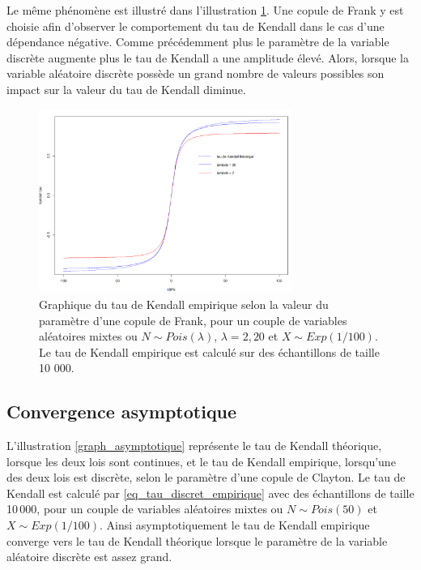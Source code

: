 \documentclass{article}
\begin{document}
 	Le même phénomène est illustré dans l'illustration \ref{graph_frank}. Une copule de Frank y est choisie afin d'observer le comportement du tau de Kendall dans le cas d'une dépendance négative. Comme précédemment plus le paramètre de la variable discrète augmente plus le tau de Kendall a une amplitude élevé. Alors, lorsque la variable aléatoire discrète possède un grand nombre de valeurs possibles son impact sur la valeur du tau de Kendall diminue.
	 
	 \begin{figure}[H]
	 	\centering
	 	\includegraphics[height=6cm]{Graph/frank.png}
	 	\caption[Copule de Frank]{Graphique du tau de Kendall empirique selon la valeur du paramètre d'une copule de Frank, pour un couple de variables aléatoires mixtes ou $N\sim Pois(\lambda)$, $\lambda = 2,20$ et $X \sim Exp(1/100)$. Le tau de Kendall empirique est calculé sur des échantillons de taille 10 000.} 
	 	\label{graph_frank}
	 \end{figure}
	 
	 \subsection{Convergence asymptotique}
	 
	 L'illustration \ref{graph_asymptotique} représente le tau de Kendall théorique, lorsque les deux lois sont continues, et le tau de Kendall empirique, lorsqu'une des deux lois est discrète, selon le paramètre d'une copule de Clayton. Le tau de Kendall est calculé par \eqref{eq_tau_discret_empirique} avec des échantillons de taille 10\,000, pour un couple de variables aléatoires mixtes ou $N\sim Pois(50)$ et $X \sim Exp(1/100)$. Ainsi asymptotiquement le tau de Kendall empirique converge vers le tau de Kendall théorique lorsque le paramètre de la variable aléatoire discrète est assez grand.
	 
\end{document}
